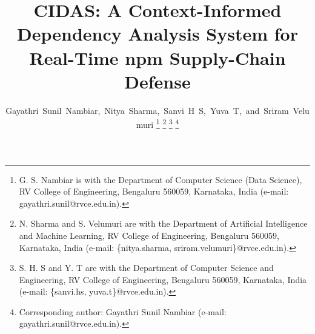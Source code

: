 \documentclass[journal]{IEEEtran}
\begin{document}
\title{CIDAS: A Context-Informed Dependency Analysis System for Real-Time npm Supply-Chain Defense}

\author{Gayathri~Sunil~Nambiar,~Nitya~Sharma,~Sanvi~H~S,~Yuva~T,~and~Sriram~Velumuri
\thanks{G. S. Nambiar is with the Department of Computer Science (Data Science), RV College of Engineering, Bengaluru 560059, Karnataka, India (e-mail: gayathri.sunil@rvce.edu.in).}
\thanks{N. Sharma and S. Velumuri are with the Department of Artificial Intelligence and Machine Learning, RV College of Engineering, Bengaluru 560059, Karnataka, India (e-mail: \{nitya.sharma, sriram.velumuri\}@rvce.edu.in).}
\thanks{S. H. S and Y. T are with the Department of Computer Science and Engineering, RV College of Engineering, Bengaluru 560059, Karnataka, India (e-mail: \{sanvi.hs, yuva.t\}@rvce.edu.in).}
\thanks{Corresponding author: Gayathri Sunil Nambiar (e-mail: gayathri.sunil@rvce.edu.in).}}


\maketitle
\end{document}
